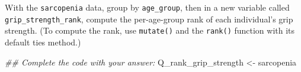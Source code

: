 \documentclass[
  letterpaper,
  DIV=11,
  numbers=noendperiod]{scrreprt}
\newenvironment{Shaded}{\begin{snugshade}}{\end{snugshade}}
\newcommand{\DocumentationTok}[1]{\textcolor[rgb]{0.37,0.37,0.37}{\textit{#1}}}
\newcommand{\NormalTok}[1]{\textcolor[rgb]{0.00,0.23,0.31}{#1}}
\newcommand{\OtherTok}[1]{\textcolor[rgb]{0.00,0.23,0.31}{#1}}
\begin{document}
\begin{tcolorbox}[enhanced jigsaw, colframe=quarto-callout-tip-color-frame, rightrule=.15mm, opacityback=0, breakable, coltitle=black, colbacktitle=quarto-callout-tip-color!10!white, bottomrule=.15mm, leftrule=.75mm, toprule=.15mm, arc=.35mm, bottomtitle=1mm, colback=white, left=2mm, opacitybacktitle=0.6, titlerule=0mm, title=\textcolor{quarto-callout-tip-color}{\faLightbulb}\hspace{0.5em}{Practice}, toptitle=1mm]

With the \texttt{sarcopenia} data, group by \texttt{age\_group}, then in
a new variable called \texttt{grip\_strength\_rank}, compute the
per-age-group rank of each individual's grip strength. (To compute the
rank, use \texttt{mutate()} and the \texttt{rank()} function with its
default ties method.)

\begin{Shaded}
\begin{Highlighting}[]
\DocumentationTok{\#\# Complete the code with your answer:}
\NormalTok{Q\_rank\_grip\_strength }\OtherTok{\textless{}{-}} 
\NormalTok{  sarcopenia}
\end{Highlighting}
\end{Shaded}

\end{tcolorbox}
\end{document}
